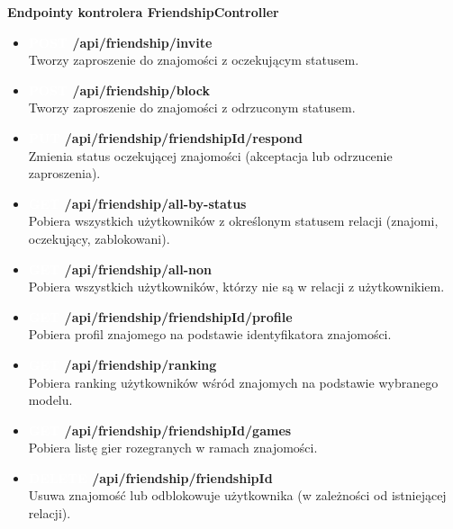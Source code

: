 \documentclass[12pt,a4paper]{article}
\begin{document}
\noindent  \textbf{Endpointy kontrolera FriendshipController}
\begin{itemize} 
    \item \textbf{\colorbox{green!90}{\textcolor{white}{POST}} /api/friendship/invite} \\
    Tworzy zaproszenie do znajomości z oczekującym statusem. 
    \item \textbf{\colorbox{green!90}{\textcolor{white}{POST}} /api/friendship/block} \\
    Tworzy zaproszenie do znajomości z odrzuconym statusem. 
    \item \textbf{\colorbox{orange!90}{\textcolor{white}{PUT}} /api/friendship/{friendshipId}/respond} \\
    Zmienia status oczekującej znajomości (akceptacja lub odrzucenie zaproszenia). 
    \item \textbf{\colorbox{cyan!90}{\textcolor{white}{GET}} /api/friendship/all-by-status} \\
    Pobiera wszystkich użytkowników z określonym statusem relacji (znajomi, oczekujący, zablokowani). 
    \item \textbf{\colorbox{cyan!90}{\textcolor{white}{GET}} /api/friendship/all-non} \\
    Pobiera wszystkich użytkowników, którzy nie są w relacji z użytkownikiem. 
    \item \textbf{\colorbox{cyan!90}{\textcolor{white}{GET}} /api/friendship/{friendshipId}/profile} \\
    Pobiera profil znajomego na podstawie identyfikatora znajomości. 
    \item \textbf{\colorbox{cyan!90}{\textcolor{white}{GET}} /api/friendship/ranking} \\
    Pobiera ranking użytkowników wśród znajomych na podstawie wybranego modelu. 
    \item \textbf{\colorbox{cyan!90}{\textcolor{white}{GET}} /api/friendship/{friendshipId}/games} \\
    Pobiera listę gier rozegranych w ramach znajomości. 
    \item \textbf{\colorbox{red!90}{\textcolor{white}{DELETE}} /api/friendship/{friendshipId}} \\
    Usuwa znajomość lub odblokowuje użytkownika (w zależności od istniejącej relacji). 
\end{itemize}

\newpage
\end{document}
